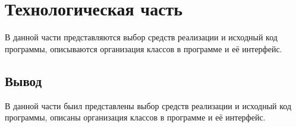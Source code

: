\chapter{Технологическая часть}

В данной части представляются выбор средств реализации и исходный код программы, описываются организация классов в программе и её интерфейс.

\section{Вывод}

В данной части быил представлены выбор средств реализации и исходный код программы, описаны организация классов в программе и её интерфейс.

\clearpage
